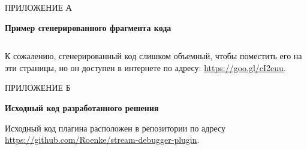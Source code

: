 \vfill
\clearpage
\appendix


    \hfill ПРИЛОЖЕНИЕ А
    \begin{center}
        \bf{Пример сгенерированного фрагмента кода}
    \end{center}
    \markboth{\MakeUppercase{}}{}
    
    \inputminted{java}{chapter4/code/Example.java}
    К сожалению, сгенерированный код слишком объемный, чтобы поместить его на эти страницы, но он доступен в интернете по адресу:
    \href{https://goo.gl/cI2euu}{https://goo.gl/cI2euu}.
    
\vfill
\clearpage
\appendix
{}
    \hfill ПРИЛОЖЕНИЕ Б
    \begin{center}
    	\bf{Исходный код разработанного решения}
    \end{center}
    \markboth{\MakeUppercase{}}{}
    
Исходный код плагина расположен в репозитории по адресу \\ \href{https://github.com/Roenke/stream-debugger-plugin}{https://github.com/Roenke/stream-debugger-plugin}.
    
